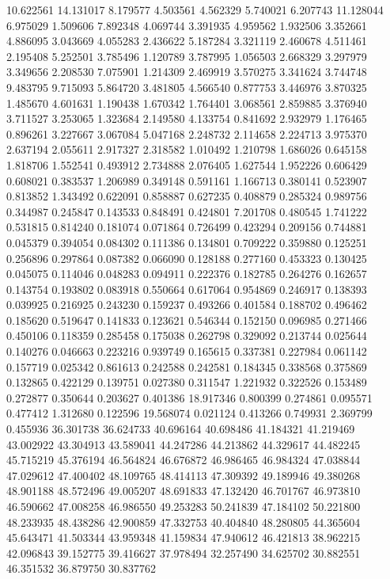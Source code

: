 10.622561
14.131017
8.179577
4.503561
4.562329
5.740021
6.207743
11.128044
6.975029
1.509606
7.892348
4.069744
3.391935
4.959562
1.932506
3.352661
4.886095
3.043669
4.055283
2.436622
5.187284
3.321119
2.460678
4.511461
2.195408
5.252501
3.785496
1.120789
3.787995
1.056503
2.668329
3.297979
3.349656
2.208530
7.075901
1.214309
2.469919
3.570275
3.341624
3.744748
9.483795
9.715093
5.864720
3.481805
4.566540
0.877753
3.446976
3.870325
1.485670
4.601631
1.190438
1.670342
1.764401
3.068561
2.859885
3.376940
3.711527
3.253065
1.323684
2.149580
4.133754
0.841692
2.932979
1.176465
0.896261
3.227667
3.067084
5.047168
2.248732
2.114658
2.224713
3.975370
2.637194
2.055611
2.917327
2.318582
1.010492
1.210798
1.686026
0.645158
1.818706
1.552541
0.493912
2.734888
2.076405
1.627544
1.952226
0.606429
0.608021
0.383537
1.206989
0.349148
0.591161
1.166713
0.380141
0.523907
0.813852
1.343492
0.622091
0.858887
0.627235
0.408879
0.285324
0.989756
0.344987
0.245847
0.143533
0.848491
0.424801
7.201708
0.480545
1.741222
0.531815
0.814240
0.181074
0.071864
0.726499
0.423294
0.209156
0.744881
0.045379
0.394054
0.084302
0.111386
0.134801
0.709222
0.359880
0.125251
0.256896
0.297864
0.087382
0.066090
0.128188
0.277160
0.453323
0.130425
0.045075
0.114046
0.048283
0.094911
0.222376
0.182785
0.264276
0.162657
0.143754
0.193802
0.083918
0.550664
0.617064
0.954869
0.246917
0.138393
0.039925
0.216925
0.243230
0.159237
0.493266
0.401584
0.188702
0.496462
0.185620
0.519647
0.141833
0.123621
0.546344
0.152150
0.096985
0.271466
0.450106
0.118359
0.285458
0.175038
0.262798
0.329092
0.213744
0.025644
0.140276
0.046663
0.223216
0.939749
0.165615
0.337381
0.227984
0.061142
0.157719
0.025342
0.861613
0.242588
0.242581
0.184345
0.338568
0.375869
0.132865
0.422129
0.139751
0.027380
0.311547
1.221932
0.322526
0.153489
0.272877
0.350644
0.203627
0.401386
18.917346
0.800399
0.274861
0.095571
0.477412
1.312680
0.122596
19.568074
0.021124
0.413266
0.749931
2.369799
0.455936
36.301738
36.624733
40.696164
40.698486
41.184321
41.219469
43.002922
43.304913
43.589041
44.247286
44.213862
44.329617
44.482245
45.715219
45.376194
46.564824
46.676872
46.986465
46.984324
47.038844
47.029612
47.400402
48.109765
48.414113
47.309392
49.189946
49.380268
48.901188
48.572496
49.005207
48.691833
47.132420
46.701767
46.973810
46.590662
47.008258
46.986550
49.253283
50.241839
47.184102
50.221800
48.233935
48.438286
42.900859
47.332753
40.404840
48.280805
44.365604
45.643471
41.503344
43.959348
41.159834
47.940612
46.421813
38.962215
42.096843
39.152775
39.416627
37.978494
32.257490
34.625702
30.882551
46.351532
36.879750
30.837762
